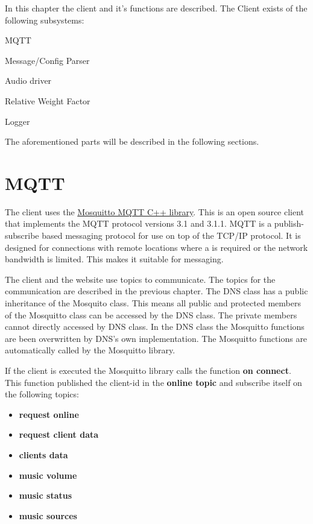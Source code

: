 In this chapter the client and it's functions are described. The Client exists of the following subsystems:
\begin{shortlist}
    \item MQTT
    \item Message/Config Parser
    \item Audio driver
    \item Relative Weight Factor
    \item Logger
\end{shortlist}

The aforementioned parts will be described in the following sections.

\section{MQTT}

The client uses the \href{http://mosquitto.org/}{Mosquitto MQTT C++ library}.
This is an open source client that implements the MQTT protocol versions 3.1 and 3.1.1.
MQTT is a publish-subscribe based  messaging protocol for use on top of the TCP/IP protocol.
It is designed for connections with remote locations where a  is required or the network bandwidth is limited.
This makes it suitable for  messaging.

The client and the website use topics to communicate. The topics for the communication are described in the previous chapter.
The DNS class has a public inheritance of the Mosquito class.
This means all public and protected members of the Mosquitto class can be accessed by the DNS class.
The private members cannot directly accessed by DNS class. In the DNS class the Mosquitto functions are been overwritten by DNS's own implementation.
The Mosquitto functions are automatically called by the Mosquitto library.

If the client is executed the Mosquitto library calls the function
\textbf{ on connect}. This function published the client-id in the \textbf{online topic } and subscribe itself on the following topics:
\small{
\begin{itemize} [noitemsep, nolistsep]
	\item \textbf {request online}
	\item \textbf {request client data}
	\item \textbf {clients data}
	\item \textbf {music volume}
	\item \textbf {music status}
	\item \textbf {music sources}
\end{itemize}
}

